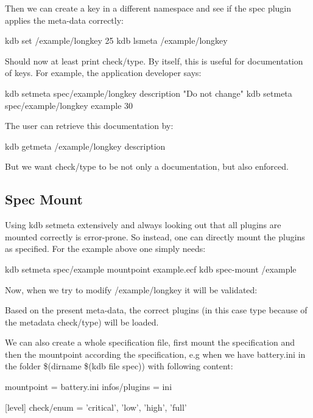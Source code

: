 Then we can create a key in a different namespace and see if the {\ttfamily spec} plugin applies the meta-\/data correctly\+: \begin{DoxyVerb}    kdb set /example/longkey 25
    kdb lsmeta /example/longkey
\end{DoxyVerb}


Should now at least print {\ttfamily check/type}. By itself, this is useful for documentation of keys. For example, the application developer says\+: \begin{DoxyVerb}    kdb setmeta spec/example/longkey description "Do not change"
    kdb setmeta spec/example/longkey example 30
\end{DoxyVerb}


The user can retrieve this documentation by\+: \begin{DoxyVerb}    kdb getmeta /example/longkey description
\end{DoxyVerb}


But we want {\ttfamily check/type} to be not only a documentation, but also enforced.

\subsection*{Spec Mount}

Using {\ttfamily kdb setmeta} extensively and always looking out that all plugins are mounted correctly is error-\/prone. So instead, one can directly mount the plugins as specified. For the example above one simply needs\+: \begin{DoxyVerb}    kdb setmeta spec/example mountpoint example.ecf
    kdb spec-mount /example
\end{DoxyVerb}


Now, when we try to modify {\ttfamily /example/longkey} it will be validated\+: 


Based on the present meta-\/data, the correct plugins (in this case {\ttfamily type} because of the metadata {\ttfamily check/type}) will be loaded.

We can also create a whole specification file, first mount the specification and then the mountpoint according the specification, e.\+g when we have {\ttfamily battery.\+ini} in the folder {\ttfamily \$(dirname \$(kdb file spec))} with following content\+: \begin{DoxyVerb}    []
    mountpoint = battery.ini
    infos/plugins = ini

    [level]
    check/enum = 'critical', 'low', 'high', 'full'
\end{DoxyVerb}


